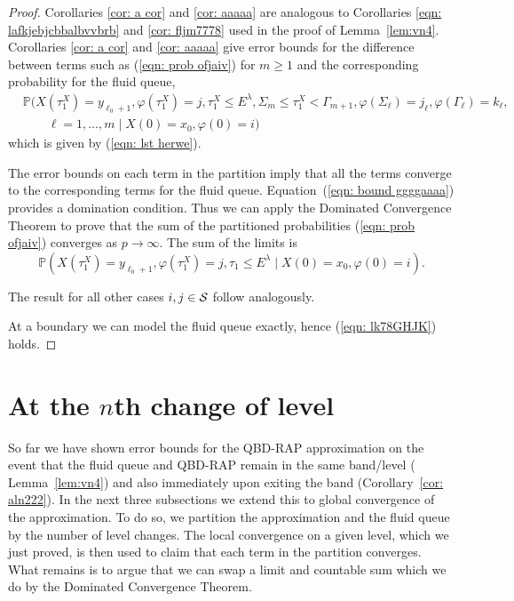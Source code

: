 \begin{proof}
	Corollaries \ref{cor: a cor} and \ref{cor: aaaaa} are analogous to Corollaries \ref{eqn: lafkjebjcbbalbvvbrb} and \ref{cor: fljm7778} used in the proof of Lemma~\ref{lem:vn4}. Corollaries \ref{cor: a cor} and \ref{cor: aaaaa} give error bounds for the difference between terms such as (\ref{eqn: prob ofjaiv}) for \(m\geq 1\) and the corresponding probability for the fluid queue, 
	\begin{align}
		&\mathbb P(X(\tau_1^X)=y_{\ell_0+1},\varphi(\tau_1^X)=j,\tau_1^X\leq E^\lambda, \Sigma_{m}\leq \tau_1^X<\Gamma_{m+1}, \varphi(\Sigma_\ell) = j_\ell, \varphi(\Gamma_\ell)=k_\ell, \nonumber
		\\&\qquad{} \ell = 1,\dots, m  \mid X(0)=x_0, \varphi(0)=i)
	\end{align}
	which is given by (\ref{eqn: lst herwe}). 
	
	The error bounds on each term in the partition imply that all the terms converge to the corresponding terms for the fluid queue. Equation~(\ref{eqn: bound ggggaaaa}) provides a domination condition. Thus we can apply the Dominated Convergence Theorem to prove that the sum of the partitioned probabilities (\ref{eqn: prob ofjaiv}) converges as \(p\to\infty\). The sum of the limits is 
	\[\mathbb P(X(\tau_1^X) = y_{\ell_0+1}, \varphi(\tau_1^X) = j, \tau_{1}\leq E^\lambda 
            	 \mid X(0) = x_0, \varphi(0) = i).\]
	 
	 The result for all other cases \(i,j\in\mathcal{S}\) follow analogously.
	
	At a boundary we can model the fluid queue exactly, hence (\ref{eqn: lk78GHJK}) holds.
\end{proof}


\section{At the \(n\)th change of level}\label{sec: nth change}

So far we have shown error bounds for the QBD-RAP approximation on the event that the fluid queue and QBD-RAP remain in the same band/level (%
Lemma~\ref{lem:vn4}) and also immediately upon exiting the band (Corollary~\ref{cor: aln222}). In the next three subsections we extend this to global convergence of the approximation. To do so, we partition the approximation and the fluid queue by the number of level changes. The local convergence on a given level, which we just proved, is then used to claim that each term in the partition converges. What remains is to argue that we can swap a limit and countable sum which we do by the Dominated Convergence Theorem. 

